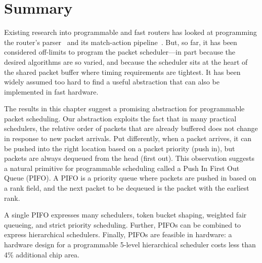 \section{Summary}
\label{s:pifo_summary}
Existing research into programmable and fast routers has looked at programming
the router's parser~\cite{glen_parsing} and its match-action
pipeline~\cite{rmt}. But, so far, it has been considered off-limits to program
the packet scheduler---in part because the desired algorithms are so varied,
and because the scheduler sits at the heart of the shared packet buffer where
timing requirements are tightest.  It has been widely assumed too hard to find
a useful abstraction that can also be implemented in fast hardware.

The results in this chapter suggest a promising abstraction for programmable
packet scheduling.  Our abstraction exploits the fact that in many practical
schedulers, the relative order of packets that are already buffered does not
change in response to new packet arrivals.  Put differently, when a packet
arrives, it can be pushed into the right location based on a packet priority
(push in), but packets are always dequeued from the head (first out).  This
observation suggests a natural primitive for programmable scheduling called a
Push In First Out Queue (PIFO). A PIFO is a priority queue where packets are
pushed in based on a rank field, and the next packet to be dequeued is the
packet with the earliest rank.

A single PIFO expresses many schedulers, \eg token bucket shaping, weighted
fair queueing, and strict priority scheduling.  Further,  PIFOs  can  be
combined  to  express  hierarchical  schedulers.   Finally, PIFOs  are
feasible  in hardware:   a hardware design for a programmable 5-level
hierarchical scheduler costs less than 4\% additional chip area.
